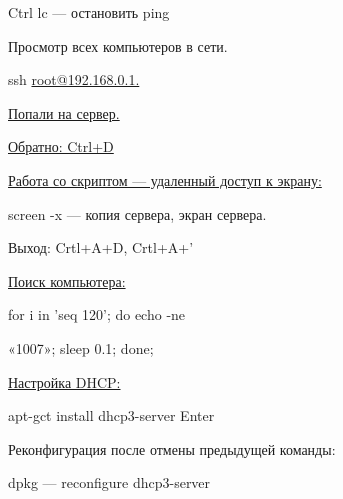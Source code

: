 \par 
Ctrl lc — остановить ping
\par 
Просмотр всех компьютеров в сети.
\par ssh
\underline{root@192.168.0.1.}
\par \underline{Попали
на сервер.}
\par \underline{Обратно:
Ctrl+D}


\par 
\underline{Работа со скриптом — удаленный доступ
к экрану:}
\par 
screen -x — копия сервера, экран сервера.
\par 
Выход: Crtl+A+D, Crtl+A+'


\par 
\underline{Поиск компьютера:}
\par 
for i in 'seq 120'; do echo -ne
\par 
	«1007»; sleep 0.1; done;
\par 
\underline{Настройка DHCP:}
\par 
apt-gct install dhcp3-server Enter
\par 
Реконфигурация после отмены предыдущей
команды:
\par 
dpkg — reconfigure dhcp3-server 

